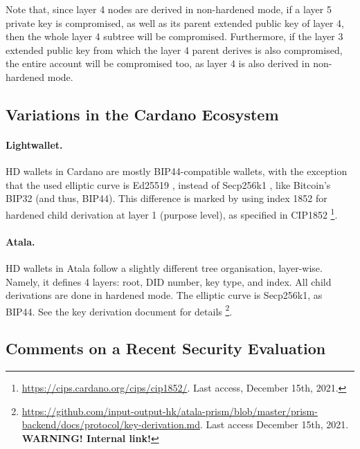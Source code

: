Note that, since layer 4 nodes are derived in non-hardened mode, if a layer 5
private key is compromised, as well as its parent extended public key of layer
4, then the whole layer 4 subtree will be compromised. Furthermore, if the
layer 3 extended public key from which the layer 4 parent derives is also
compromised, the entire account will be compromised too, as layer 4 is also
derived in non-hardened mode.

\subsection{Variations in the Cardano Ecosystem}

\paragraph{Lightwallet.} HD wallets in Cardano are mostly BIP44-compatible
wallets, with the exception that the used elliptic curve is Ed25519 \needcite,
instead of Secp256k1 \needcite, like Bitcoin's BIP32 (and thus, BIP44). This
difference is marked by using index 1852 for hardened child derivation at
layer 1 (purpose level), as specified in CIP1852%
\footnote{\url{https://cips.cardano.org/cips/cip1852/}. Last access, December
  15th, 2021.}.

\paragraph{Atala.} HD wallets in Atala follow a slightly different tree
organisation, layer-wise. Namely, it defines 4 layers: root, DID number, key
type, and index. All child derivations are done in hardened mode. The elliptic
curve is Secp256k1, as BIP44. See the key derivation document for details%
\footnote{\url{https://github.com/input-output-hk/atala-prism/blob/master/prism-backend/docs/protocol/key-derivation.md}. Last access December 15th, 2021. \textbf{WARNING!
    Internal link!}}.

\subsection{Comments on a Recent Security Evaluation}

\cite{def+21}

